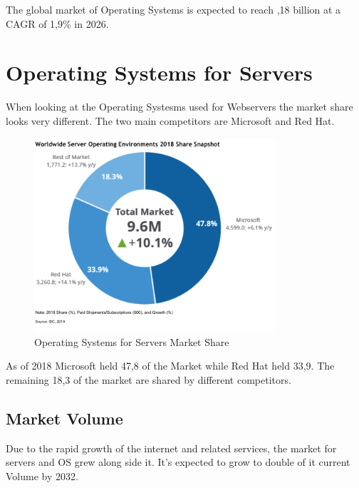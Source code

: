 The global market of Operating Systems is expected to reach ,18 billion at a CAGR of 1,9\% in 2026. 
\cite{OsMarketShare3}

\cite{OsMarketShare}
\cite{OsWikipedia}

\section{Operating Systems for Servers}

When looking at the Operating Systesms used for Webservers the market share looks very different.
The two main competitors are Microsoft and Red Hat. 

\begin{figure}[H]
    \centering
    \includegraphics[width=0.8\textwidth]{figures/server-operating-system-market-share-2018.png}
    \caption{Operating Systems for Servers Market Share}
    \label{fig:Operating_Systems_for_Servers_Market_Share}
\end{figure}

As of 2018 Microsoft held 47,8\text{\%} of the Market while Red Hat held 33,9\text{\%}. 
The remaining 18,3\text{\%} of the market are shared by different competitors.   
\cite{SeverOsMarketShare}

\subsection{Market Volume}

Due to the rapid growth of the internet and related services, the market for servers and OS grew along side it. 
It's expected to grow to double of it current Volume by 2032. 




\author{Florian Prandstetter}
